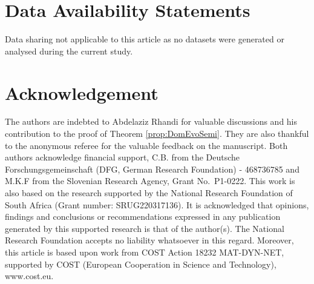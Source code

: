 \documentclass[a4paper,oneside,10pt]{amsart}
\theoremstyle{definition}
\numberwithin{equation}{section}
\begin{document}
\section*{Data Availability Statements}
Data sharing not applicable to this article as no datasets were generated or analysed during the current study.

\section*{Acknowledgement}
{The authors are indebted to Abdelaziz Rhandi for valuable discussions and his contribution to the proof of Theorem \ref{prop:DomEvoSemi}. They are also thankful to the anonymous referee for the valuable feedback on the manuscript.} Both authors acknowledge financial support,  C.B. from the Deutsche Forschungsgemeinschaft (DFG, German Research Foundation) - 468736785 and M.K.F from the Slovenian Research Agency, Grant No.~P1-0222. {This work is also based on the research supported by the National Research Foundation of South Africa (Grant number: SRUG220317136). It is acknowledged that opinions, findings and conclusions or recommendations expressed in any publication generated by this supported research is that of the author(s). The National Research Foundation accepts no liability whatsoever in this regard.} Moreover, this article is based upon work from COST Action 18232 MAT-DYN-NET, supported by COST (European Cooperation in Science and Technology), www.cost.eu.
\end{document}
